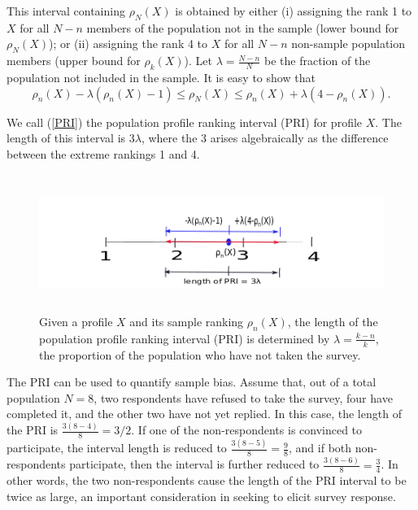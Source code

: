 \documentclass[a4paper, 12pt]{article}
\begin{document}
{\flushleft This} interval containing $\rho_N(X) $ is obtained by either (i) assigning the  rank 1 to $X$ for all $N-n$ members of the population not in the sample (lower bound for $\rho_N(X)$); or (ii) assigning the rank 4 to $X$  for all $N-n$ non-sample population members (upper bound for $\rho_k(X)$). Let  $\lambda=\frac{N-n}{N}$ be the fraction of the population not included in the sample.  It is easy to show that
\begin{equation}
\rho_n(X)-\lambda(\rho_n(X)-1)\le \rho_N(X) \le \rho_n(X) + \lambda(4-\rho_n(X)).
\label{PRI}
\end{equation}

{\flushleft We} call (\ref{PRI}) the population profile ranking interval (PRI) for profile $X$.  The length of this interval is 
  $3\lambda$, where the 3 arises algebraically as the difference between  the extreme rankings 1 and 4.

\begin{figure}[!htpb]
\centering
\includegraphics[width=6.5in, height=1.75in]{Confidence_Interval.png}
\caption{Given a profile $X$ and its sample ranking $\rho_n(X)$, the length of the population profile ranking interval (PRI) is determined by $\lambda=\frac{k-n}{k}$, the proportion of the population who have not taken the survey.}
\label{AL}
\end{figure}



The PRI can be used to quantify sample bias. Assume that, out of a total population $N=8$, two respondents have refused to take the survey, four have completed it, and the other two have not yet replied. In this case, the length of the PRI is  $\frac{3(8-4)}{8}=3/2$. If one of the non-respondents is convinced to participate, the interval length is reduced to $\frac{3(8-5)}{8}=\frac{9}{8}$, and if both non-respondents participate, then the interval is further reduced to $\frac{3(8-6)}{8}=\frac{3}{4}$. In other words, the two non-respondents  cause the length of the PRI interval to be twice as large, an important consideration in seeking to elicit survey response.
\end{document}
